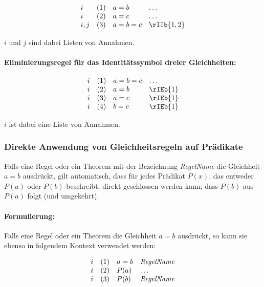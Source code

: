\documentclass{book}
\theoremstyle{plain}
\theoremstyle{remark}
\theoremstyle{definition}
\begin{document}
\[
\begin{array}{llll}
	i & (1) & a = b & \dots \\
        i & (2) & a = c & \dots \\
 	i,j & (3) & a = b = c & \rIIb{1,2} \\
\end{array}
\]

\(i\) und \(j\) sind dabei Listen von Annahmen.


\paragraph{Eliminierungsregel für das Identitätssymbol dreier Gleichheiten:}
\label{rule:rIEb}

\[
\begin{array}{llll}
	i & (1) & a = b = c & \dots \\
        i & (2) & a = b & \rIEb{1} \\
 	i & (3) & a = c & \rIEb{1} \\
        i & (4) & b = c & \rIEb{1} \\
\end{array}
\]

\(i\) ist dabei eine Liste von Annahmen.

\subsubsection{Direkte Anwendung von Gleichheitsregeln auf Prädikate}

Falls eine Regel oder ein Theorem mit der Bezeichnung \textit{RegelName} die Gleichheit \(a = b\) ausdrückt, gilt automatisch, dass für jedes Prädikat \(P(x)\), das entweder \(P(a)\) oder \(P(b)\) beschreibt, direkt geschlossen werden kann, dass \(P(b)\) aus \(P(a)\) folgt (und umgekehrt).

\paragraph{Formulierung:}
Falls eine Regel oder ein Theorem die Gleichheit \(a = b\) ausdrückt, so kann sie ebenso in folgendem Kontext verwendet werden:

\[
\begin{array}{llll}
	i & (1) & a = b & \text{\textit{RegelName}} \\
	i & (2) & P(a) & \dots \\
	i & (3) & P(b) & \text{\textit{RegelName}} \\
\end{array}
\]
\end{document}

